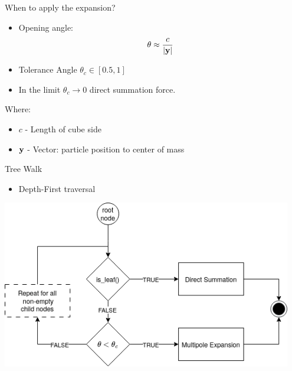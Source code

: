 \begin{frame}{When to apply the expansion?}
	\begin{itemize}
		\item Opening angle:
		      \begin{equation}
			      \theta \approx \frac{c}{|\vb{y}|}
		      \end{equation}
		\item Tolerance Angle $\theta_c \in [0.5, 1]$
		\item In the limit $\theta_c \rightarrow 0$  direct summation force.
	\end{itemize}\bigskip

	{\footnotesize
		Where:
		\begin{itemize}
			\item $c$ - Length of cube side
			\item $\vb{y}$ - Vector: particle position to center of mass
		\end{itemize}
	}
\end{frame}

\begin{frame}{Tree Walk}
	\begin{itemize}
		\item Depth-First traversal
	\end{itemize}
	\includegraphics[width=0.95\textwidth]{figures/multipole_uml.png}
\end{frame}


